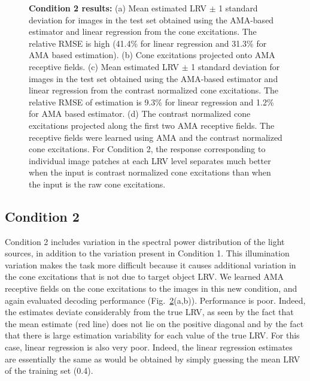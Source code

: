 \documentclass{jov}
\begin{document}
\begin{figure}
\begin{subfigure}[b]{0.22 \textwidth}
        \label{fig:case2RFResponseContrast}
    \end{subfigure}
    \caption{{\bf Condition 2 results:} (a) Mean estimated LRV $\pm$ 1 standard deviation for images in the test set obtained using the AMA-based estimator and linear regression from the cone excitations. The relative RMSE is high (41.4\% for linear regression and 31.3\% for AMA based estimation). (b) Cone excitations projected onto AMA receptive fields. (c) Mean estimated LRV $\pm$ 1 standard deviation for images in the test set obtained using the AMA-based estimator and linear regression from the contrast normalized cone excitations. The relative RMSE of estimation is 9.3\% for linear regression and 1.2\% for AMA based estimator. (d) The contrast normalized cone excitations projected along the first two AMA receptive fields. The receptive fields were learned using AMA and the contrast normalized cone excitations. For Condition 2, the response corresponding to individual image patches at each LRV level separates much better when the input is contrast normalized cone excitations than when the input is the raw cone excitations.}
\label{fig:Condition2}
\end{figure}

\subsection{Condition 2}

Condition 2 includes variation in the spectral power distribution of the light sources, in addition to the variation present in Condition 1. 
This illumination variation makes the task more difficult because it causes additional variation in the cone excitations that is not due to target object LRV. 
We learned AMA receptive fields on the cone excitations to the images in this new condition, and again evaluated decoding performance (Fig.~\ref{fig:Condition2}(a,b)). 
Performance is poor.
Indeed, the estimates deviate considerably from the true LRV, as seen by the fact that the mean estimate
(red line) does not lie on the positive diagonal and by the fact that there is large estimation variability for each
value of the true LRV.
For this case, linear regression is also very poor. Indeed, the linear regression estimates are essentially the same as would be obtained
by simply guessing the mean LRV of the training set (0.4).
\end{document}
